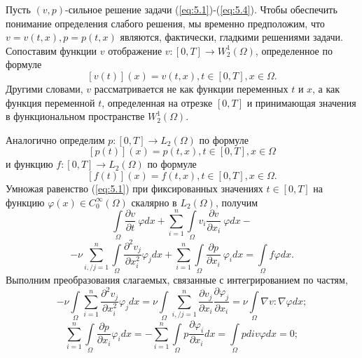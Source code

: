 Пусть $(v, p)$-сильное решение задачи (\ref{eq:5.1})-(\ref{eq:5.4}).
Чтобы обеспечить понимание определения слабого решения, мы временно предположим, что $v=v(t, x), p=p(t, x)$ являются, фактически, гладкими решениями задачи.
Сопоставим функции $v$ отображение $v:[0, T]\rightarrow W^1_2(\Omega)$, определенное по формуле $$[v(t)](x)=v(t, x), t\in[0, T], x\in\Omega.$$
Другими словами, $v$ рассматривается не как функции переменных $t$ и $x$, а как функция переменной $t$, определенная на отрезке
$[0, T]$ и принимающая значения в функциональном пространстве $W^1_2(\Omega)$.

Аналогично определим $p:[0, T]\rightarrow L_2(\Omega)$ по формуле $$[p(t)](x)=p(t, x), t\in[0, T], x\in\Omega$$
и функцию $f:[0, T]\rightarrow L_2(\Omega)$ по формуле $$[f(t)](x)=f(t, x), t\in[0, T], x\in\Omega.$$
Умножая равенство (\ref{eq:5.1}) при фиксированных значениях $t\in [0, T]$ на функцию $\varphi (x)\in C_0^{\infty}(\Omega)$ скалярно в $L_2(\Omega)$, получим
$$\int\limits_\Omega \frac{\partial v}{\partial t}\ \varphi dx+\sum_{i=1}^n\int\limits_\Omega v_i\frac{\partial v}{\partial x_i}\ \varphi dx-$$
$$-\nu \sum_{i, / j=1}^n\int\limits_\Omega\frac{\partial^2 v_j}{\partial x^{2}_i} \varphi_j dx+
\sum_{i=1}^n\int\limits_\Omega \frac{\partial p}{\partial x_i}\ \varphi_idx=\int\limits_\Omega f\varphi dx.$$
Выполним преобразования слагаемых, связанные с интегрированием по частям,
$$-\nu\int\limits_\Omega \sum_{i=1}^{n}\frac{\partial^2 v_j}{\partial x^{2}_i}\varphi_j dx=
\nu\int\limits_\Omega\sum_{i, / j=1}^{n}\frac{\partial v_j}{\partial x_i}\frac{\partial \varphi_j}{\partial x_i}=\nu\int\limits_\Omega \nabla v:\nabla\varphi dx;$$
$$\sum_{i=1}^{n}\int\limits_\Omega \frac{\partial p}{\partial x_i}\varphi_i dx
=-\sum_{i=1}^{n}\int\limits_\Omega p\frac{\partial \varphi_i}{\partial x_i}dx= \int\limits_\Omega p div\varphi dx=0;$$

